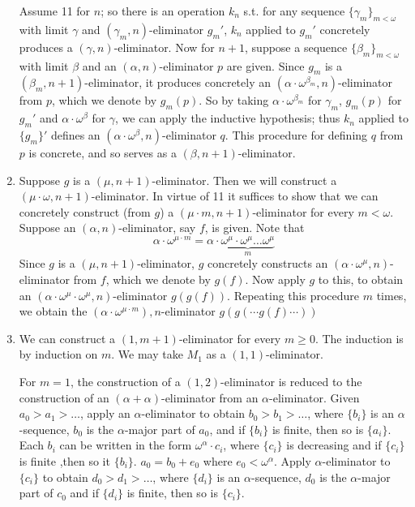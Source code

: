 \documentclass[11pt]{article}
\begin{document}
\begin{enumerate}
Assume 11 for \(n\); so there is an operation \(k_n\) s.t. for any
sequence \(\{\gamma_m\}_{m<\omega}\) with limit \(\gamma\)
and \((\gamma_m,n)\)-eliminator \(g_m'\), \(k_n\) applied to \(g_m'\) concretely produces
a \((\gamma,n)\)-eliminator. Now for \(n+1\), suppose a sequence \(\{\beta_m\}_{m<\omega}\) with limit
\(\beta\) and an \((\alpha,n)\)-eliminator \(p\) are given. Since \(g_m\) is
a \((\beta_m,n+1)\)-eliminator, it produces concretely
an \((\alpha\cdot\omega^{\beta_m},n)\)-eliminator from \(p\), which we denote by \(g_m(p)\).
So by taking \(\alpha\cdot\omega^{\beta_m}\) for \(\gamma_m\), \(g_m(p)\) for \(g_m'\)
and \(\alpha\cdot\omega^\beta\) for \(\gamma\), we can apply the inductive hypothesis; thus \(k_n\)
applied to \(\{g_m\}'\) defines an \((\alpha\cdot\omega^\beta,n)\)-eliminator \(q\). This
procedure for defining \(q\) from \(p\) is concrete, and so serves as a \((\beta,n+1)\)-eliminator.
\item Suppose \(g\) is a \((\mu,n+1)\)-eliminator. Then we will construct
a \((\mu\cdot\omega,n+1)\)-eliminator.  In virtue of 11 it suffices to show that we can
concretely construct (from \(g\)) a \((\mu\cdot m,n+1)\)-eliminator for every \(m<\omega\).
Suppose an \((\alpha,n)\)-eliminator, say \(f\), is given. Note that
   \begin{equation*}
\alpha\cdot\omega^{\mu\cdot m}=\alpha\cdot
\underbrace{\omega^\mu\cdot\omega^\mu\dots\omega^\mu}_{m}
   \end{equation*}
Since \(g\) is a \((\mu,n+1)\)-eliminator, \(g\) concretely constructs
an \((\alpha\cdot\omega^\mu,n)\)-eliminator from \(f\), which we denote by \(g(f)\). Now apply
\(g\) to this, to obtain
an \((\alpha\cdot\omega^\mu\cdot\omega^\mu,n)\)-eliminator \(g(g(f))\). Repeating this
procedure \(m\) times, we obtain
the \((\alpha\cdot\omega^{\mu\cdot m}),n\)-eliminator \(g(g(\cdots g(f)\cdots))\)
\item We can construct a \((1,m+1)\)-eliminator for every \(m\ge0\). The induction is by induction
on \(m\). We may take \(M_1\) as a \((1,1)\)-eliminator.

For \(m=1\), the construction of a \((1,2)\)-eliminator is reduced to the construction of
an \((\alpha+\alpha)\)-eliminator from an \(\alpha\)-eliminator. Given \(a_0>a_1>\dots\),
apply an \(\alpha\)-eliminator to obtain \(b_0>b_1>\dots\), where \(\{b_i\}\) is
an \(\alpha\)-sequence, \(b_0\) is the \(\alpha\)-major part of \(a_0\), and if \(\{b_i\}\)
is finite, then so is \(\{a_i\}\). Each \(b_i\) can be written in the form \(\omega^\alpha \cdot c_i\),
where \(\{c_i\}\) is decreasing and if \(\{c_i\}\) is finite ,then so
it \(\{b_i\}\). \(a_0=b_0+e_0\) where \(e_0<\omega^\alpha\). Apply \(\alpha\)-eliminator
to \(\{c_i\}\) to obtain \(d_0>d_1>\dots\), where \(\{d_i\}\) is
an \(\alpha\)-sequence, \(d_0\) is the \(\alpha\)-major part of \(c_0\) and if \(\{d_i\}\) is
finite, then so is \(\{c_i\}\).


\end{enumerate}
\end{document}
